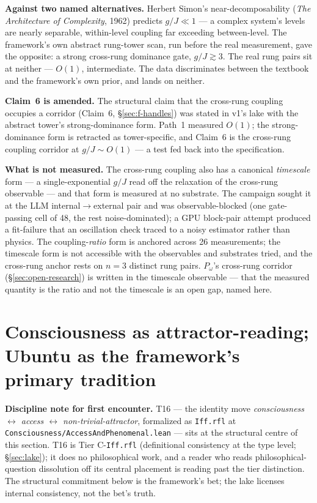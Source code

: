 \documentclass[11pt,a4paper]{article}
\newcommand{\Pomega}{P_{\omega}}
\begin{document}
\textbf{Against two named alternatives.} Herbert Simon's near-decomposability (\emph{The Architecture of Complexity}, 1962) predicts $g/J \ll 1$ --- a complex system's levels are nearly separable, within-level coupling far exceeding between-level. The framework's own abstract rung-tower scan, run before the real measurement, gave the opposite: a strong cross-rung dominance gate, $g/J \gtrsim 3$. The real rung pairs sit at neither --- $O(1)$, intermediate. The data discriminates between the textbook and the framework's own prior, and lands on neither.

\textbf{Claim~6 is amended.} The structural claim that the cross-rung coupling occupies a corridor (Claim~6, \S\ref{sec:f-handles}) was stated in v1's lake with the abstract tower's strong-dominance form. Path~1 measured $O(1)$; the strong-dominance form is retracted as tower-specific, and Claim~6 is the cross-rung coupling corridor at $g/J \sim O(1)$ --- a test fed back into the specification.

\textbf{What is not measured.} The cross-rung coupling also has a canonical \emph{timescale} form --- a single-exponential $g/J$ read off the relaxation of the cross-rung observable --- and that form is measured at no substrate. The campaign sought it at the LLM internal$\to$external pair and was observable-blocked (one gate-passing cell of 48, the rest noise-dominated); a GPU block-pair attempt produced a fit-failure that an oscillation check traced to a noisy estimator rather than physics. The coupling-\emph{ratio} form is anchored across 26 measurements; the timescale form is not accessible with the observables and substrates tried, and the cross-rung anchor rests on $n = 3$ distinct rung pairs. $\Pomega$'s cross-rung corridor (\S\ref{sec:open-research}) is written in the timescale observable --- that the measured quantity is the ratio and not the timescale is an open gap, named here.

\section{Consciousness as attractor-reading; Ubuntu as the framework's primary tradition}\label{sec:tsvf-ubuntu}

\textbf{Discipline note for first encounter.} T16 --- the identity move \emph{consciousness $\leftrightarrow$ access $\leftrightarrow$ non-trivial-attractor}, formalized as \texttt{Iff.rfl} at \texttt{Consciousness/AccessAndPhenomenal.lean} --- sits at the structural centre of this section. T16 is Tier C-\texttt{Iff.rfl} (definitional consistency at the type level; \S\ref{sec:lake}); it does no philosophical work, and a reader who reads philosophical-question dissolution off its central placement is reading past the tier distinction. The structural commitment below is the framework's bet; the lake licenses internal consistency, not the bet's truth.
\end{document}
